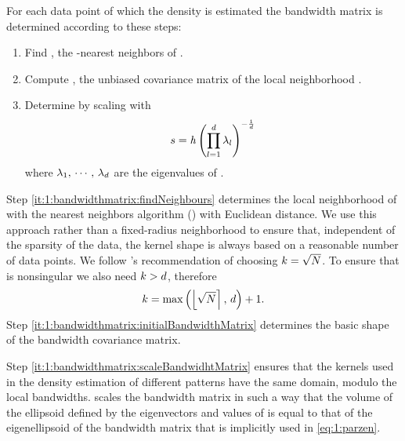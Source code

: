 	For each data point \varPattern of which the density is estimated the bandwidth matrix is determined according to these steps:
		\begin{enumerate}[labelindent=0ex]
			\item \label{it:1:bandwidthmatrix:findNeighbours}
				Find \varNeighborhood{\varPattern}, the \KNNK-nearest neighbors of \varPattern.
			\item \label{it:1:bandwidthmatrix:initialBandwidthMatrix}
				Compute \varCovarianceMatrix, the unbiased covariance matrix of the local neighborhood \varNeighborhood{\varPattern}.
			\item \label{it:1:bandwidthmatrix:scaleBandwidhtMatrix}
				Determine \varBandwidthMatrix by scaling \varCovarianceMatrix with
				\begin{equation}\label{eq:method:scalingFactor}
					s = \mathit{h} \left( \displaystyle\prod_{l = 1}^{d} \lambda_{l} \right)^{-\frac{1}{d}}
				\end{equation}
				where $\lambda_1,\, \cdots,\, \lambda_d$ are the eigenvalues of \varCovarianceMatrix.  
		\end{enumerate}	
			Step \ref{it:1:bandwidthmatrix:findNeighbours} determines the local neighborhood of \varPattern with the \KNNK nearest neighbors algorithm (\KNN) with Euclidean distance. We use this approach rather than a fixed-radius neighborhood to ensure that, independent of the sparsity of the data, the kernel shape is always based on a reasonable number of data points. 
			We follow \citeauthor{silverman1986density}'s \cite{silverman1986density} recommendation of choosing $k = \sqrt{N}$. To ensure that \varCovarianceMatrix is nonsingular we also need $k > d$, therefore
			\begin{equation*}
				k = \max\left(\left\lfloor \sqrt{N} \right\rceil,\, d \right) + 1.	
			\end{equation*}
			Step \ref{it:1:bandwidthmatrix:initialBandwidthMatrix} determines the basic shape of the bandwidth covariance matrix. 

			Step \ref{it:1:bandwidthmatrix:scaleBandwidhtMatrix} ensures that the kernels used in the density estimation of different patterns have the same domain, modulo the local bandwidths.  scales the bandwidth matrix in such a way that the volume of the ellipsoid defined by the eigenvectors and values of \varBandwidthMatrix is equal to that of the eigenellipsoid of the bandwidth matrix that is implicitly used in \cref{eq:1:parzen}.